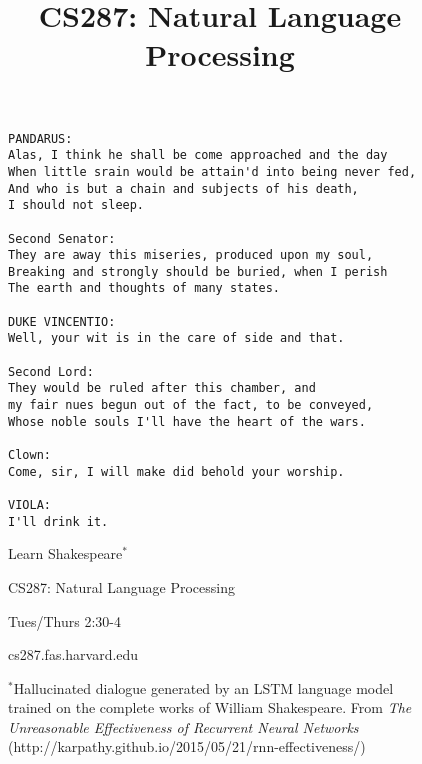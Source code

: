 \documentclass{article}
\title{CS287: Natural Language Processing}
\date{}
\begin{document}
\begin{figure}[c!]
  \centering
\vspace{2cm}

\begin{Verbatim}
PANDARUS:
Alas, I think he shall be come approached and the day
When little srain would be attain'd into being never fed,
And who is but a chain and subjects of his death,
I should not sleep.

Second Senator:
They are away this miseries, produced upon my soul,
Breaking and strongly should be buried, when I perish
The earth and thoughts of many states.

DUKE VINCENTIO:
Well, your wit is in the care of side and that.

Second Lord:
They would be ruled after this chamber, and
my fair nues begun out of the fact, to be conveyed,
Whose noble souls I'll have the heart of the wars.

Clown:
Come, sir, I will make did behold your worship.

VIOLA:
I'll drink it.
\end{Verbatim}

\vspace{1cm}
\begin{center}
\begin{center}
  {\huge Learn Shakespeare$^*$}
\end{center}
\vspace{1cm}

 {\LARGE CS287: Natural Language Processing}
 \vspace{0.25cm}

 {\LARGE Tues/Thurs 2:30-4 }
 \vspace{0.25cm}

 {\LARGE cs287.fas.harvard.edu}



\vspace{3cm}
{\footnotesize $^*$Hallucinated dialogue generated by an LSTM language model trained on the complete works of William Shakespeare. From \textit{The Unreasonable Effectiveness of Recurrent Neural Networks}  (http://karpathy.github.io/2015/05/21/rnn-effectiveness/)}

\end{center}
\end{figure}
\end{document}
